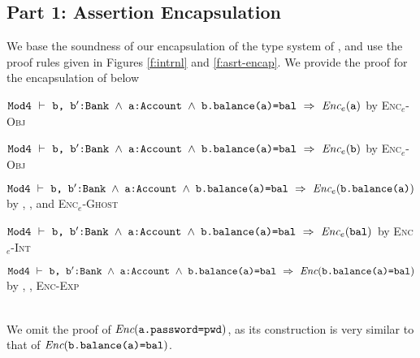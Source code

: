 \subsection{Part 1: Assertion Encapsulation}
\label{s:BA-encap}
We base the soundness of our encapsulation of the type system of \Loo, and use the proof rules given in Figures \ref{f:intrnl} and \ref{f:asrt-encap}.
We provide the proof for the encapsulation of  below\\
\begin{proofexample}
	{\begin{proofexample}
			{\proofstepwithrule
			{${\texttt{Mod4}}\ \vdash\ {\texttt{b, b$^\prime$:Bank $\wedge$ a:Account $\wedge$ b.balance(a)=bal}}\ \Rightarrow\ \textit{Enc$_e$}({\texttt{a}})$}
				{by \textsc{Enc$_e$-Obj}}
		}
		\endproofsteps
	\end{proofexample}
		}
	{\begin{proofexample}
		\proofsteps{\prg{bEnc}}
			{\proofstepwithrule
			{${\texttt{Mod4}}\ \vdash\ {\texttt{b, b$^\prime$:Bank $\wedge$ a:Account $\wedge$ b.balance(a)=bal}}\ \Rightarrow\ \textit{Enc$_e$}({\texttt{b}})$}
				{by \textsc{Enc$_e$-Obj}}
		}
		\endproofsteps
	\end{proofexample}
		}
	{\begin{proofexample}
		\proofsteps{\prg{getBalEnc}}
			{\proofstepwithrule
			{${\texttt{Mod4}}\ \vdash\ {\texttt{b, b$^\prime$:Bank $\wedge$ a:Account $\wedge$ b.balance(a)=bal}}\ \Rightarrow\ \textit{Enc$_e$}({\texttt{b.balance(a)}})$}
				{by , , and \textsc{Enc$_e$-Ghost}}
		}
		\endproofsteps
	\end{proofexample}
		}
	{\begin{proofexample}
		\proofsteps{\prg{balEnc}}
			{\proofstepwithrule
			{${\texttt{Mod4}}\ \vdash\ {\texttt{b, b$^\prime$:Bank $\wedge$ a:Account $\wedge$ b.balance(a)=bal}}\ \Rightarrow\ \textit{Enc$_e$}({\texttt{bal}})$}
				{by \textsc{Enc$_e$-Int}}
		}
		\endproofsteps
	\end{proofexample}
		}
		{\proofstepwithrule
			{
			${\texttt{Mod4}}\ \vdash\ {\texttt{b, b$^\prime$:Bank $\wedge$ a:Account $\wedge$ b.balance(a)=bal}}\ \Rightarrow\ \textit{Enc}({\texttt{b.balance(a)=bal}})$
			}{by , , \textsc{Enc-Exp}}}
\endproofsteps
\end{proofexample}\\
We omit the proof of $\textit{Enc}({\texttt{a.password=pwd}})$, as its construction is very similar to that of $\textit{Enc}({\texttt{b.balance(a)=bal}})$.


